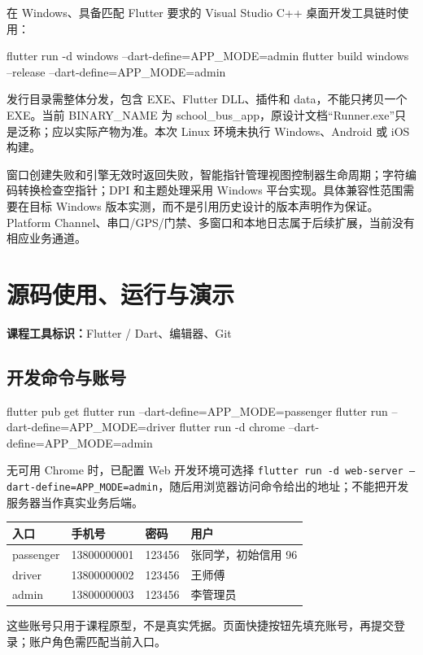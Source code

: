 \documentclass[UTF8,fontset=fandol,zihao=-4,oneside]{ctexrep}
\newcommand{\toolmark}[1]{\par\noindent\textbf{课程工具标识：}#1\par}
\begin{document}
在 Windows、具备匹配 Flutter 要求的 Visual Studio C++ 桌面开发工具链时使用：
\begin{code}
flutter run -d windows --dart-define=APP_MODE=admin
flutter build windows --release --dart-define=APP_MODE=admin
\end{code}
发行目录需整体分发，包含 EXE、Flutter DLL、插件和 data，不能只拷贝一个 EXE。当前 BINARY\_NAME 为 school\_bus\_app，原设计文档“Runner.exe”只是泛称；应以实际产物为准。本次 Linux 环境未执行 Windows、Android 或 iOS 构建。

窗口创建失败和引擎无效时返回失败，智能指针管理视图控制器生命周期；字符编码转换检查空指针；DPI 和主题处理采用 Windows 平台实现。具体兼容性范围需要在目标 Windows 版本实测，而不是引用历史设计的版本声明作为保证。Platform Channel、串口/GPS/门禁、多窗口和本地日志属于后续扩展，当前没有相应业务通道。

\chapter{源码使用、运行与演示}
\toolmark{Flutter / Dart、编辑器、Git}
\section{开发命令与账号}
\begin{code}
flutter pub get
flutter run --dart-define=APP_MODE=passenger
flutter run --dart-define=APP_MODE=driver
flutter run -d chrome --dart-define=APP_MODE=admin
\end{code}
无可用 Chrome 时，已配置 Web 开发环境可选择 \texttt{flutter run -d web-server --dart-define=APP\_MODE=admin}，随后用浏览器访问命令给出的地址；不能把开发服务器当作真实业务后端。

\begin{longtable}{p{3cm}p{3cm}p{2.5cm}p{6.2cm}}
\toprule 入口 & 手机号 & 密码 & 用户 \\ \midrule
passenger & 13800000001 & 123456 & 张同学，初始信用 96 \\
driver & 13800000002 & 123456 & 王师傅 \\
admin & 13800000003 & 123456 & 李管理员 \\
\bottomrule
\end{longtable}
这些账号只用于课程原型，不是真实凭据。页面快捷按钮先填充账号，再提交登录；账户角色需匹配当前入口。
\end{document}
